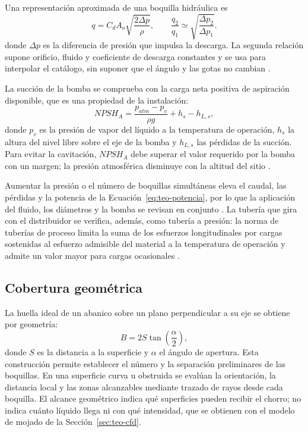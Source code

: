 Una representación aproximada de una boquilla hidráulica es
\begin{equation}
  q=C_dA_o\sqrt{\frac{2\Delta p}{\rho}},\qquad
  \frac{q_2}{q_1}\simeq\sqrt{\frac{\Delta p_2}{\Delta p_1}}.
  \label{eq:teo-boquilla}
\end{equation}
donde $\Delta p$ es la diferencia de presión que impulsa la descarga. La segunda relación supone orificio, fluido y coeficiente de descarga constantes y se usa para interpolar el catálogo, sin suponer que el ángulo y las gotas no cambian \cite{white2016}.

La succión de la bomba se comprueba con la carga neta positiva de aspiración disponible, que es una propiedad de la instalación:
\begin{equation}
  NPSH_A=\frac{p_{atm}-p_v}{\rho g}+h_s-h_{L,s},
  \label{eq:teo-npsh}
\end{equation}
donde $p_v$ es la presión de vapor del líquido a la temperatura de operación, $h_s$ la altura del nivel libre sobre el eje de la bomba y $h_{L,s}$ las pérdidas de la succión. Para evitar la cavitación, $NPSH_A$ debe superar el valor requerido por la bomba con un margen; la presión atmosférica disminuye con la altitud del sitio \cite{white2016}.

Aumentar la presión o el número de boquillas simultáneas eleva el caudal, las pérdidas y la potencia de la Ecuación~\eqref{eq:teo-potencia}, por lo que la aplicación del fluido, los diámetros y la bomba se revisan en conjunto \cite{white2016}. La tubería que gira con el distribuidor se verifica, además, como tubería a presión: la norma de tuberías de proceso limita la suma de los esfuerzos longitudinales por cargas sostenidas al esfuerzo admisible del material a la temperatura de operación y admite un valor mayor para cargas ocasionales \cite{asmeb313}.

\subsection{Cobertura geométrica}

La huella ideal de un abanico sobre un plano perpendicular a su eje se obtiene por geometría:
\begin{equation}
  B=2S\tan\left(\frac{\alpha}{2}\right),
  \label{eq:teo-huella}
\end{equation}
donde $S$ es la distancia a la superficie y $\alpha$ el ángulo de apertura. Esta construcción permite establecer el número y la separación preliminares de las boquillas. En una superficie curva u obstruida se evalúan la orientación, la distancia local y las zonas alcanzables mediante trazado de rayos desde cada boquilla. El alcance geométrico indica qué superficies pueden recibir el chorro; no indica cuánto líquido llega ni con qué intensidad, que se obtienen con el modelo de mojado de la Sección~\ref{sec:teo-cfd}.

